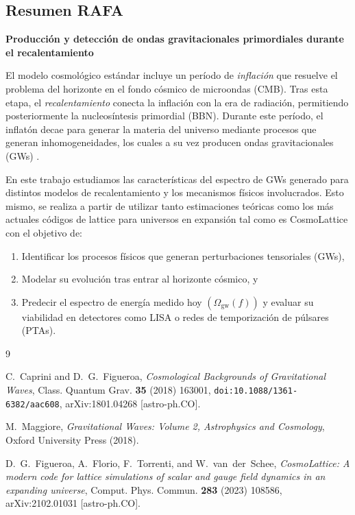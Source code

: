 \subsection{Resumen RAFA}

\begin{infobox}[cyan]{\textbf{Producción y detección de ondas gravitacionales primordiales durante el recalentamiento}}

El modelo cosmológico estándar incluye un período de \textit{inflación} que resuelve el problema del horizonte en el fondo cósmico de microondas (CMB). Tras esta etapa, el \textit{recalentamiento} conecta la inflación con la era de radiación, permitiendo posteriormente la nucleosíntesis primordial (BBN). Durante este período, el inflatón decae para generar la materia del universo mediante procesos que generan inhomogeneidades, los cuales a su vez producen ondas gravitacionales (GWs) \cite{figueroa_caprini, maggiore}.

En este trabajo estudiamos las características del espectro de GWs generado para distintos modelos de recalentamiento y los mecanismos físicos involucrados. Esto mismo, se realiza a partir de utilizar tanto estimaciones teóricas como los más actuales códigos de lattice para universos en expansión tal como es CosmoLattice \cite{cosmolattice} con el objetivo de:

\begin{enumerate}
    \item[(i)] Identificar los procesos físicos que generan perturbaciones tensoriales (GWs),
    
    \item[(ii)] Modelar su evolución tras entrar al horizonte cósmico, y
    
    \item[(iii)] Predecir el espectro de energía medido hoy $\left( \Omega_{\mathrm{gw}}(f) \right)$ y evaluar su viabilidad en detectores como LISA o redes de temporización de púlsares (PTAs).
\end{enumerate}

\begin{thebibliography}{9}

C.~Caprini and D.~G.~Figueroa,
\textit{Cosmological Backgrounds of Gravitational Waves},
Class. Quantum Grav. \textbf{35} (2018) 163001,
\texttt{doi:10.1088/1361-6382/aac608},
arXiv:1801.04268 [astro-ph.CO].

M.~Maggiore,
\textit{Gravitational Waves: Volume 2, Astrophysics and Cosmology},
Oxford University Press (2018).

D.~G.~Figueroa, A.~Florio, F.~Torrenti, and W.~van~der~Schee, 
\textit{CosmoLattice: A modern code for lattice simulations of scalar and gauge field dynamics in an expanding universe}, 
Comput. Phys. Commun. \textbf{283} (2023) 108586, 
arXiv:2102.01031 [astro-ph.CO].

\end{thebibliography}

\end{infobox}

